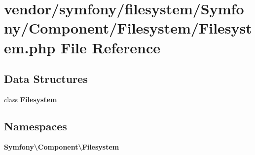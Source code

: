 \section{vendor/symfony/filesystem/\+Symfony/\+Component/\+Filesystem/\+Filesystem.php File Reference}
\label{symfony_2filesystem_2_symfony_2_component_2_filesystem_2_filesystem_8php}
\subsection*{Data Structures}
\begin{DoxyCompactItemize}
\item 
class {\bf Filesystem}
\end{DoxyCompactItemize}
\subsection*{Namespaces}
\begin{DoxyCompactItemize}
\item 
 {\bf Symfony\textbackslash{}\+Component\textbackslash{}\+Filesystem}
\end{DoxyCompactItemize}
